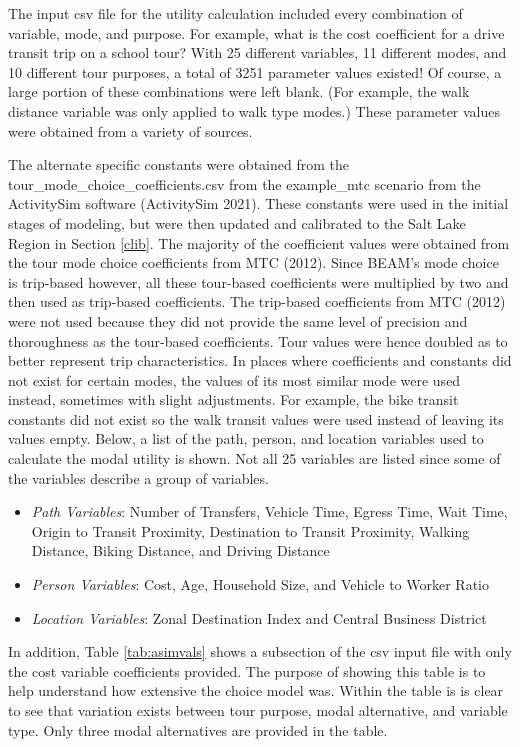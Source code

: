 \documentclass[12pt, oneside, openright]{byuthesis}
\providecommand{\tightlist}{%
  \setlength{\itemsep}{0pt}\setlength{\parskip}{0pt}}
\begin{document}
The input csv file for the utility calculation included every combination of variable, mode, and purpose. For example, what is the cost coefficient for a drive transit trip on a school tour? With 25 different variables, 11 different modes, and 10 different tour purposes, a total of 3251 parameter values existed! Of course, a large portion of these combinations were left blank. (For example, the walk distance variable was only applied to walk type modes.) These parameter values were obtained from a variety of sources.

The alternate specific constants were obtained from the tour\_mode\_choice\_coefficients.csv from the example\_mtc scenario from the ActivitySim software (ActivitySim 2021). These constants were used in the initial stages of modeling, but were then updated and calibrated to the Salt Lake Region in Section \ref{clib}. The majority of the coefficient values were obtained from the tour mode choice coefficients from MTC (2012). Since BEAM's mode choice is trip-based however, all these tour-based coefficients were multiplied by two and then used as trip-based coefficients. The trip-based coefficients from MTC (2012) were not used because they did not provide the same level of precision and thoroughness as the tour-based coefficients. Tour values were hence doubled as to better represent trip characteristics. In places where coefficients and constants did not exist for certain modes, the values of its most similar mode were used instead, sometimes with slight adjustments. For example, the bike transit constants did not exist so the walk transit values were used instead of leaving its values empty. Below, a list of the path, person, and location variables used to calculate the modal utility is shown. Not all 25 variables are listed since some of the variables describe a group of variables.

\begin{itemize}
\tightlist
\item
  \emph{Path Variables}: Number of Transfers, Vehicle Time, Egress Time, Wait Time, Origin to Transit Proximity, Destination to Transit Proximity, Walking Distance, Biking Distance, and Driving Distance
\item
  \emph{Person Variables}: Cost, Age, Household Size, and Vehicle to Worker Ratio
\item
  \emph{Location Variables}: Zonal Destination Index and Central Business District
\end{itemize}

In addition, Table \ref{tab:asimvals} shows a subsection of the csv input file with only the cost variable coefficients provided. The purpose of showing this table is to help understand how extensive the choice model was. Within the table is is clear to see that variation exists between tour purpose, modal alternative, and variable type. Only three modal alternatives are provided in the table.
\end{document}

